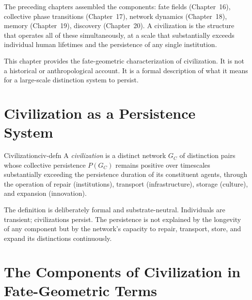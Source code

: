 \documentclass[12pt,twoside,openright]{book}
\providecommand{\distNet}{G}
\providecommand{\netPersist}[1]{P(#1)}
\begin{document}
The preceding chapters assembled the components: fate fields
(Chapter~16), collective phase transitions (Chapter~17),
network dynamics (Chapter~18), memory (Chapter~19), discovery
(Chapter~20). A civilization is the structure that operates
all of these simultaneously, at a scale that substantially
exceeds individual human lifetimes and the persistence of
any single institution.

This chapter provides the fate-geometric characterization of
civilization. It is not a historical or anthropological
account. It is a formal description of what it means for a
large-scale distinction system to persist.

\section{Civilization as a Persistence System}

\begin{definition}{Civilization}{civ-defn}
A \emph{civilization} is a distinct network $\distNet_C$ of
distinction pairs whose collective persistence $\netPersist{\distNet_C}$
remains positive over timescales substantially exceeding
the persistence duration of its constituent agents, through
the operation of repair (institutions), transport
(infrastructure), storage (culture), and expansion (innovation).
\end{definition}

The definition is deliberately formal and substrate-neutral.
Individuals are transient; civilizations persist. The
persistence is not explained by the longevity of any component
but by the network's capacity to repair, transport, store, and
expand its distinctions continuously.

\section{The Components of Civilization in Fate-Geometric Terms}
\end{document}
